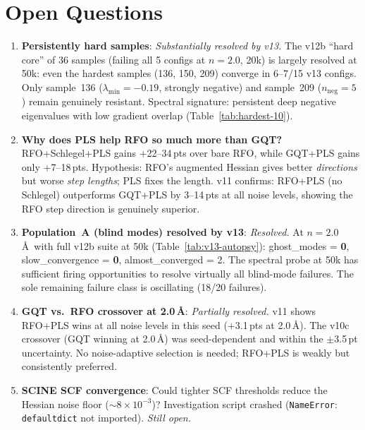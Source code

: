 \documentclass[11pt,a4paper]{article}
\theoremstyle{definition}
\begin{document}
\section{Open Questions}
\label{sec:open}

\begin{enumerate}
  \item \textbf{Persistently hard samples}: \emph{Substantially resolved
    by v13.}  The v12b ``hard core'' of 36 samples (failing all 5 configs
    at $n=2.0$, 20k) is largely resolved at 50k: even the hardest samples
    (136, 150, 209) converge in 6--7/15 v13 configs.  Only sample~136
    ($\lambda_\text{min}=-0.19$, strongly negative) and sample~209
    ($n_\text{neg}=5$) remain genuinely resistant.  Spectral signature:
    persistent deep negative eigenvalues with low gradient overlap
    (Table~\ref{tab:hardest-10}).

  \item \textbf{Why does PLS help RFO so much more than GQT?}
    RFO+Schlegel+PLS gains +22--34\,pts over bare RFO, while GQT+PLS gains
    only +7--18\,pts.  Hypothesis: RFO's augmented Hessian gives better
    \emph{directions} but worse \emph{step lengths}; PLS fixes the length.
    v11 confirms: RFO+PLS (no Schlegel) outperforms GQT+PLS by 3--14\,pts
    at all noise levels, showing the RFO step direction is genuinely
    superior.

  \item \textbf{Population~A (blind modes) resolved by v13}:
    \emph{Resolved.}  At $n=2.0$\,\AA\ with full v12b suite at 50k
    (Table~\ref{tab:v13-autopsy}): ghost\_modes = \textbf{0},
    slow\_convergence = \textbf{0}, almost\_converged = 2.  The
    spectral probe at 50k has sufficient firing opportunities to
    resolve virtually all blind-mode failures.  The sole remaining
    failure class is oscillating (18/20 failures).

  \item \textbf{GQT vs.\ RFO crossover at 2.0\,\AA}: \emph{Partially
    resolved.}  v11 shows RFO+PLS wins at all noise levels in this seed
    ($+$3.1\,pts at 2.0\,\AA).  The v10c crossover (GQT winning at
    2.0\,\AA) was seed-dependent and within the $\pm$3.5\,pt
    uncertainty.  No noise-adaptive selection is needed; RFO+PLS
    is weakly but consistently preferred.

  \item \textbf{SCINE SCF convergence}: Could tighter SCF thresholds reduce
    the Hessian noise floor ($\sim8\times10^{-3}$)?  Investigation script
    crashed (\texttt{NameError}: \texttt{defaultdict} not imported).
    \emph{Still open.}


\end{enumerate}
\end{document}

